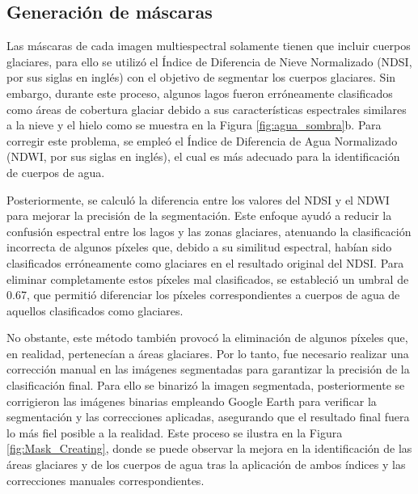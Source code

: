 \subsection{Generación de máscaras}


Las máscaras de cada imagen multiespectral solamente tienen que incluir cuerpos glaciares, para ello se utilizó el Índice de Diferencia de Nieve Normalizado (NDSI, por sus siglas en inglés) con el objetivo de segmentar los cuerpos glaciares. Sin embargo, durante este proceso, algunos lagos fueron erróneamente clasificados como áreas de cobertura glaciar debido a sus características espectrales similares a la nieve y el hielo como se muestra en la Figura \ref{fig:agua_sombra}b. Para corregir este problema, se empleó el Índice de Diferencia de Agua Normalizado (NDWI, por sus siglas en inglés), el cual es más adecuado para la identificación de cuerpos de agua.

Posteriormente, se calculó la diferencia entre los valores del NDSI y el NDWI para mejorar la precisión de la segmentación. Este enfoque ayudó a reducir la confusión espectral entre los lagos y las zonas glaciares, atenuando la clasificación incorrecta de algunos píxeles que, debido a su similitud espectral, habían sido clasificados erróneamente como glaciares en el resultado original del NDSI. Para eliminar completamente estos píxeles mal clasificados, se estableció un umbral de 0.67, que permitió diferenciar los píxeles correspondientes a cuerpos de agua de aquellos clasificados como glaciares.

No obstante, este método también provocó la eliminación de algunos píxeles que, en realidad, pertenecían a áreas glaciares. Por lo tanto, fue necesario realizar una corrección manual en las imágenes segmentadas para garantizar la precisión de la clasificación final. Para ello se binarizó la imagen segmentada, posteriormente se corrigieron las imágenes binarias empleando Google Earth para verificar la segmentación y las correcciones aplicadas, asegurando que el resultado final fuera lo más fiel posible a la realidad. Este proceso se ilustra en la Figura \ref{fig:Mask_Creating}, donde se puede observar la mejora en la identificación de las áreas glaciares y de los cuerpos de agua tras la aplicación de ambos índices y las correcciones manuales correspondientes.

